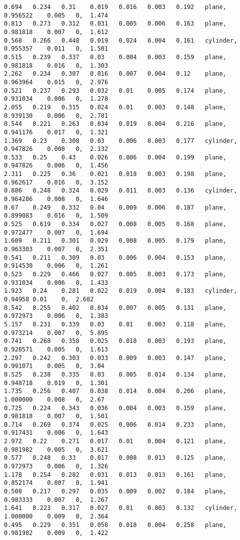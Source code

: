 {\begin{lstlisting}[caption={Datos obtenidos para la prueba del plano usando AE.}]
0.694	0.234	0.31	0.019	0.016	0.003	0.192	plane,  	0.956522	0.005	0, 	1.474
0.813	0.273	0.312	0.031	0.005	0.006	0.163	plane,  	0.981818	0.007	0, 	1.612
0.568	0.266	0.448	0.019	0.024	0.004	0.161	cylinder, 	0.955357	0.011	0, 	1.501
0.515	0.239	0.337	0.03	0.004	0.003	0.159	plane,  	0.981818	0.016	0, 	1.303
2.262	0.234	0.307	0.016	0.007	0.004	0.12	plane,  	0.963964	0.015	0, 	2.976
0.521	0.237	0.293	0.032	0.01	0.005	0.174	plane,  	0.931034	0.006	0, 	1.278
2.055	0.219	0.315	0.024	0.01	0.003	0.148	plane,  	0.939130	0.006	0, 	2.781
0.544	0.221	0.263	0.034	0.019	0.004	0.216	plane,  	0.941176	0.017	0, 	1.321
1.369	0.23	0.308	0.03	0.006	0.003	0.177	cylinder, 	0.947826	0.008	0, 	2.132
0.533	0.25	0.43	0.026	0.006	0.004	0.199	plane,  	0.947826	0.006	0, 	1.456
2.311	0.225	0.36	0.021	0.018	0.003	0.198	plane,  	0.962617	0.016	0, 	3.152
0.886	0.248	0.324	0.029	0.011	0.003	0.136	cylinder, 	0.964286	0.008	0, 	1.646
0.67	0.249	0.332	0.04	0.009	0.006	0.187	plane,  	0.899083	0.016	0, 	1.509
0.525	0.619	0.334	0.027	0.008	0.005	0.168	plane,  	0.972477	0.007	0, 	1.694
1.609	0.211	0.301	0.029	0.008	0.005	0.179	plane,  	0.963303	0.007	0, 	2.351
0.541	0.211	0.309	0.03	0.006	0.004	0.153	plane,  	0.914530	0.006	0, 	1.261
0.523	0.229	0.466	0.027	0.005	0.003	0.173	plane,  	0.931034	0.006	0, 	1.433
1.923	0.24	0.281	0.022	0.019	0.004	0.183	cylinder, 	0.94958	0.01	0, 	2.682
0.542	0.255	0.402	0.034	0.007	0.005	0.131	plane,  	0.972973	0.006	0, 	1.383
5.157	0.231	0.339	0.03	0.01	0.003	0.118	plane,  	0.973214	0.007	0, 	5.895
0.741	0.268	0.358	0.025	0.018	0.003	0.193	plane,  	0.928571	0.005	0, 	1.613
2.297	0.242	0.303	0.033	0.009	0.003	0.147	plane,  	0.991071	0.005	0, 	3.04
0.525	0.238	0.335	0.03	0.005	0.014	0.134	plane,  	0.948718	0.019	0, 	1.301
1.735	0.256	0.407	0.038	0.014	0.004	0.206	plane,   	1.000000	0.008	0, 	2.67
0.725	0.224	0.343	0.036	0.004	0.003	0.159	plane,  	0.981818	0.007	0, 	1.501
0.714	0.269	0.374	0.025	0.006	0.014	0.233	plane,  	0.917431	0.006	0, 	1.643
2.972	0.22	0.271	0.017	0.01	0.004	0.121	plane,  	0.981982	0.005	0, 	3.621
0.577	0.248	0.33	0.017	0.008	0.013	0.125	plane,  	0.972973	0.006	0, 	1.326
1.178	0.254	0.282	0.031	0.013	0.013	0.161	plane,  	0.852174	0.007	0, 	1.941
0.508	0.217	0.297	0.035	0.009	0.002	0.184	plane,  	0.983333	0.007	0, 	1.267
1.641	0.223	0.317	0.027	0.01	0.003	0.132	cylinder,  	1.000000	0.009	0, 	2.364
0.495	0.229	0.351	0.058	0.018	0.004	0.258	plane,  	0.981982	0.009	0, 	1.422

	\end{lstlisting}
}$ $ \\

